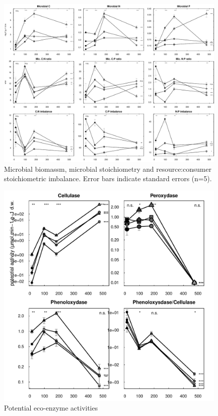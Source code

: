 \documentclass[authoryear,preprint,review,12pt]{elsarticle}
\begin{document}
\newpage
\begin{figure}[h!s]
\vspace*{2mm}
\begin{center}
\includegraphics{sbb-mb}
\end{center}
\caption{Microbial biomassm, microbial stoichiometry and resource:consumer stoichiometric imbalance. Error bars indicate standard errors (n=5).}
\label{fig:mb}
\end{figure}






\newpage
\begin{figure}[h!]
\vspace*{2mm}
\begin{center}
\includegraphics{sbb-enz}
\end{center}
\caption{Potential eco-enzyme activities}
\label{fig:enz}
\end{figure}
\end{document}

